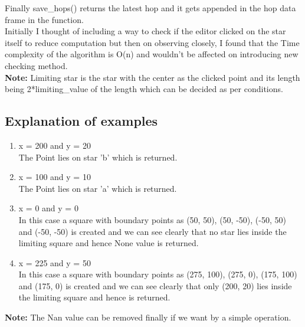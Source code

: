 \documentclass{article}
\begin{document}
Finally {\color{blue}save\_hops()} returns the latest hop and it gets appended in the hop data frame in the {\color{blue}{main()}} function.
\\

Initially I thought of including a way to check if the editor clicked on the star itself to reduce computation but then on observing closely, I found that the Time complexity of the algorithm is O(n) and wouldn't be affected on introducing new checking method. 
\\

\textbf{Note:} Limiting star is the star with the center as the clicked point and its length being 2*limiting\_value of the length which can be decided as per conditions.

\subsection{Explanation of examples}
\begin{enumerate}
\item x = 200 and y = 20 \\
The Point lies on star 'b' which is returned.
\item x = 100 and y = 10 \\
The Point lies on star 'a' which is returned.
\item x = 0 and y = 0 \\
In this case a square with boundary points as (50, 50), (50, -50), (-50, 50) and (-50, -50) is created and we can see clearly that no star lies inside the limiting square and hence None value is returned.
\item x = 225 and y = 50 \\
In this case a square with boundary points as (275, 100), (275, 0), (175, 100) and (175, 0) is created and we can see clearly that only (200, 20) lies inside the limiting square and hence is returned.
\end{enumerate}


\textbf{Note:} The Nan value can be removed finally if we want by a simple operation.
\end{document}
